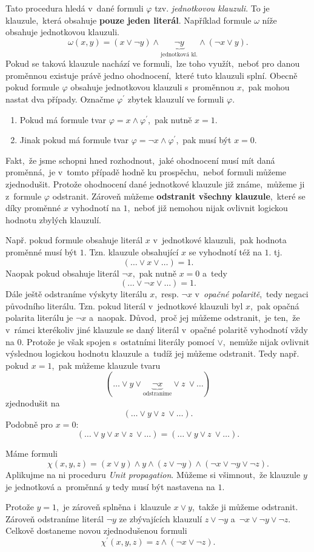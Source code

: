 Tato procedura hledá v~dané formuli $\varphi$ tzv. \emph{jednotkovou klauzuli}. To je klauzule,~která obsahuje \textbf{pouze jeden literál}. Například formule $\omega$ níže obsahuje jednotkovou klauzuli.
\[\omega(x,y)=(x\lor\neg y)\land \underbrace{\neg y}_{\text{jednotková kl.}}\land (\neg x\lor y).\]
Pokud se taková klauzule nachází ve formuli,~lze toho využít,~neboť pro danou proměnnou existuje právě jedno ohodnocení,~které tuto klauzuli splní. Obecně pokud formule $\varphi$ obsahuje jednotkovou klauzuli s~proměnnou $x$,~pak mohou nastat dva případy. Označme $\varphi^\prime$ zbytek klauzulí ve formuli $\varphi$.
\begin{enumerate}
    \item Pokud má formule tvar $\varphi=x\land\varphi^\prime$,~pak nutně $x=1$.
    \item Jinak pokud má formule tvar $\varphi=\neg x\land\varphi^\prime$,~pak musí být $x=0$.
\end{enumerate}
Fakt,~že jsme schopni hned rozhodnout,~jaké ohodnocení musí mít daná proměnná,~je v~tomto případě hodně ku prospěchu,~neboť formuli můžeme zjednodušit. Protože ohodnocení dané jednotkové klauzule již známe,~můžeme ji z~formule $\varphi$ odstranit. Zároveň můžeme \textbf{odstranit všechny klauzule},~které se díky proměnné $x$ vyhodnotí na $1$,~neboť již nemohou nijak ovlivnit logickou hodnotu zbylých klauzulí.

Např. pokud formule obsahuje literál $x$ v~jednotkové klauzuli,~pak hodnota proměnné musí být $1$. Tzn. klauzule obsahující $x$ se vyhodnotí též na $1$. tj. 
\[(\dots\lor x\lor\dots)=1.\]
Naopak pokud obsahuje literál $\neg x$,~pak nutně $x=0$ a~tedy
\[(\dots\lor \neg x\lor\dots)=1.\]
Dále ještě odstraníme výskyty literálu $x$,~resp. $\neg x$ v~\emph{opačné polaritě},~tedy negaci původního literálu. Tzn. pokud literál v~jednotkové klauzuli byl $x$,~pak opačná polarita literálu je $\neg x$ a~naopak. Důvod,~proč jej můžeme odstranit,~je ten,~že v~rámci kterékoliv jiné klauzule se daný literál v~opačné polaritě vyhodnotí vždy na $0$. Protože je však spojen s~ostatními literály pomocí $\lor$,~nemůže nijak ovlivnit výslednou logickou hodnotu klauzule a~tudíž jej můžeme odstranit. Tedy např. pokud $x=1$,~pak můžeme klauzule tvaru
\[(\dots\lor y \lor \underbrace{\neg x}_{\text{odstraníme}} \lor z~\lor \dots)\]
zjednodušit na
\[(\dots\lor y \lor z~\lor \dots).\]
Podobně pro $x=0$:
\[(\dots\lor y \lor x \lor z~\lor \dots)=(\dots\lor y \lor z~\lor \dots).\]

\begin{example}
    Máme formuli
    \[\chi(x,y,z)=(x\lor y)\land y\land (z\lor \neg y)\land(\neg x\lor \neg y\lor \neg z).\]
    Aplikujme na ni proceduru \emph{Unit propagation}. Můžeme si všimnout,~že klauzule $y$ je jednotková a~proměnná $y$ tedy musí být nastavena na $1$.

    Protože $y=1$,~je zároveň splněna i~klauzule $x\lor y$,~takže ji můžeme odstranit. Zároveň odstraníme literál $\neg y$ ze zbývajících klauzulí $z\lor\neg y$ a~$\neg x\lor\neg y\lor\neg z$.
    Celkově dostaneme novou zjednodušenou formuli
    \[\chi^\prime(x,y,z)=z\land(\neg x\lor \neg z).\]
\end{example}

